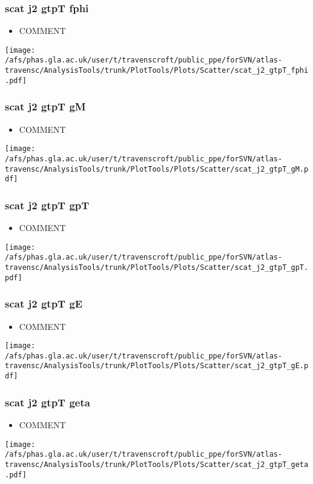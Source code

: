 \documentclass{beamer}
\begin{document}
\begin{frame}
\frametitle{scat j2 gtpT fphi}
\begin{itemize}
\item COMMENT
\end{itemize}
\begin{center}
\texttt{[image: /afs/phas.gla.ac.uk/user/t/travenscroft/public\_ppe/forSVN/atlas-travensc/AnalysisTools/trunk/PlotTools/Plots/Scatter/scat\_j2\_gtpT\_fphi.pdf]}
\end{center}
\end{frame}

\begin{frame}
\frametitle{scat j2 gtpT gM}
\begin{itemize}
\item COMMENT
\end{itemize}
\begin{center}
\texttt{[image: /afs/phas.gla.ac.uk/user/t/travenscroft/public\_ppe/forSVN/atlas-travensc/AnalysisTools/trunk/PlotTools/Plots/Scatter/scat\_j2\_gtpT\_gM.pdf]}
\end{center}
\end{frame}

\begin{frame}
\frametitle{scat j2 gtpT gpT}
\begin{itemize}
\item COMMENT
\end{itemize}
\begin{center}
\texttt{[image: /afs/phas.gla.ac.uk/user/t/travenscroft/public\_ppe/forSVN/atlas-travensc/AnalysisTools/trunk/PlotTools/Plots/Scatter/scat\_j2\_gtpT\_gpT.pdf]}
\end{center}
\end{frame}

\begin{frame}
\frametitle{scat j2 gtpT gE}
\begin{itemize}
\item COMMENT
\end{itemize}
\begin{center}
\texttt{[image: /afs/phas.gla.ac.uk/user/t/travenscroft/public\_ppe/forSVN/atlas-travensc/AnalysisTools/trunk/PlotTools/Plots/Scatter/scat\_j2\_gtpT\_gE.pdf]}
\end{center}
\end{frame}

\begin{frame}
\frametitle{scat j2 gtpT geta}
\begin{itemize}
\item COMMENT
\end{itemize}
\begin{center}
\texttt{[image: /afs/phas.gla.ac.uk/user/t/travenscroft/public\_ppe/forSVN/atlas-travensc/AnalysisTools/trunk/PlotTools/Plots/Scatter/scat\_j2\_gtpT\_geta.pdf]}
\end{center}
\end{frame}
\end{document}
